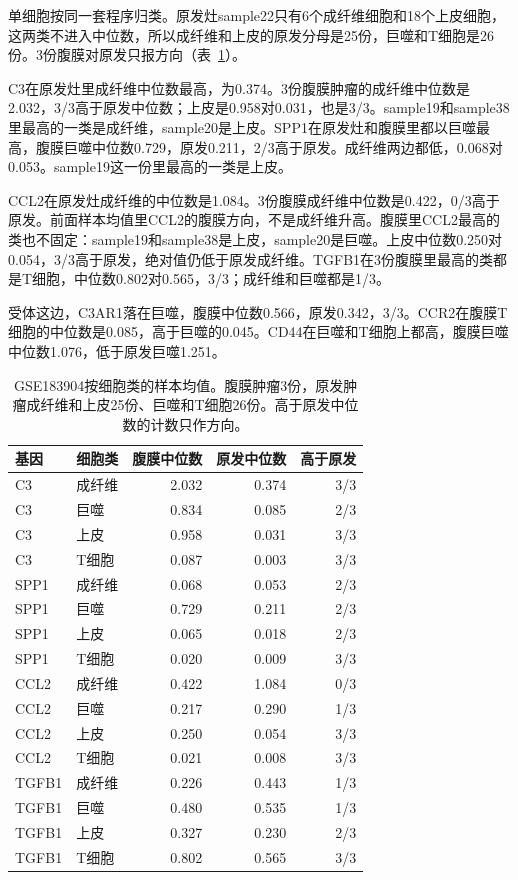 单细胞按同一套程序归类。原发灶sample22只有6个成纤维细胞和18个上皮细胞，这两类不进入中位数，所以成纤维和上皮的原发分母是25份，巨噬和T细胞是26份。3份腹膜对原发只报方向（表~\ref{tab:source}）。

C3在原发灶里成纤维中位数最高，为0.374。3份腹膜肿瘤的成纤维中位数是2.032，3/3高于原发中位数；上皮是0.958对0.031，也是3/3。sample19和sample38里最高的一类是成纤维，sample20是上皮。SPP1在原发灶和腹膜里都以巨噬最高，腹膜巨噬中位数0.729，原发0.211，2/3高于原发。成纤维两边都低，0.068对0.053。sample19这一份里最高的一类是上皮。

CCL2在原发灶成纤维的中位数是1.084。3份腹膜成纤维中位数是0.422，0/3高于原发。前面样本均值里CCL2的腹膜方向，不是成纤维升高。腹膜里CCL2最高的类也不固定：sample19和sample38是上皮，sample20是巨噬。上皮中位数0.250对0.054，3/3高于原发，绝对值仍低于原发成纤维。TGFB1在3份腹膜里最高的类都是T细胞，中位数0.802对0.565，3/3；成纤维和巨噬都是1/3。

受体这边，C3AR1落在巨噬，腹膜中位数0.566，原发0.342，3/3。CCR2在腹膜T细胞的中位数是0.085，高于巨噬的0.045。CD44在巨噬和T细胞上都高，腹膜巨噬中位数1.076，低于原发巨噬1.251。

\begin{table}[htbp]
  \centering
  \caption{GSE183904按细胞类的样本均值。腹膜肿瘤3份，原发肿瘤成纤维和上皮25份、巨噬和T细胞26份。高于原发中位数的计数只作方向。}
  \label{tab:source}
  \footnotesize
  \setlength{\tabcolsep}{4pt}
  \begin{tabular}{llrrr}
    \toprule
    基因 & 细胞类 & 腹膜中位数 & 原发中位数 & 高于原发 \\
    \midrule
    C3 & 成纤维 & 2.032 & 0.374 & 3/3 \\
    C3 & 巨噬 & 0.834 & 0.085 & 2/3 \\
    C3 & 上皮 & 0.958 & 0.031 & 3/3 \\
    C3 & T细胞 & 0.087 & 0.003 & 3/3 \\
    SPP1 & 成纤维 & 0.068 & 0.053 & 2/3 \\
    SPP1 & 巨噬 & 0.729 & 0.211 & 2/3 \\
    SPP1 & 上皮 & 0.065 & 0.018 & 2/3 \\
    SPP1 & T细胞 & 0.020 & 0.009 & 3/3 \\
    CCL2 & 成纤维 & 0.422 & 1.084 & 0/3 \\
    CCL2 & 巨噬 & 0.217 & 0.290 & 1/3 \\
    CCL2 & 上皮 & 0.250 & 0.054 & 3/3 \\
    CCL2 & T细胞 & 0.021 & 0.008 & 3/3 \\
    TGFB1 & 成纤维 & 0.226 & 0.443 & 1/3 \\
    TGFB1 & 巨噬 & 0.480 & 0.535 & 1/3 \\
    TGFB1 & 上皮 & 0.327 & 0.230 & 2/3 \\
    TGFB1 & T细胞 & 0.802 & 0.565 & 3/3 \\
    \bottomrule
  \end{tabular}
\end{table}
